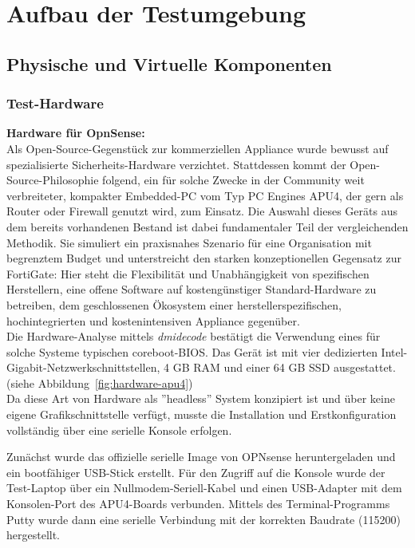 \chapter{Aufbau der Testumgebung}
\section{Physische und Virtuelle Komponenten}
\subsection{Test-Hardware}
\textbf{Hardware für OpnSense:}\\
Als Open-Source-Gegenstück zur kommerziellen Appliance wurde bewusst auf spezialisierte Sicherheits-Hardware verzichtet. Stattdessen kommt der Open-Source-Philosophie folgend, ein für solche Zwecke in der Community weit verbreiteter, kompakter Embedded-PC vom Typ PC Engines APU4, der gern als Router oder Firewall genutzt wird, zum Einsatz. Die Auswahl dieses Geräts aus dem bereits vorhandenen Bestand ist dabei fundamentaler Teil der vergleichenden Methodik. Sie simuliert ein praxisnahes Szenario für eine Organisation mit begrenztem Budget und unterstreicht den starken konzeptionellen Gegensatz zur FortiGate: Hier steht die Flexibilität und Unabhängigkeit von spezifischen Herstellern, eine offene Software auf kostengünstiger Standard-Hardware zu betreiben, dem geschlossenen Ökosystem einer herstellerspezifischen, hochintegrierten und kostenintensiven Appliance gegenüber.\\

Die Hardware-Analyse mittels \textit{dmidecode} bestätigt die Verwendung eines für solche Systeme typischen coreboot-BIOS. Das Gerät ist mit vier dedizierten Intel-Gigabit-Netzwerkschnittstellen, 4 GB RAM und einer 64 GB SSD ausgestattet. (siehe Abbildung~\ref{fig:hardware-apu4})\\

Da diese Art von Hardware als ''headless'' System konzipiert ist und über keine eigene Grafikschnittstelle verfügt, musste die Installation und Erstkonfiguration vollständig über eine serielle Konsole erfolgen.

Zunächst wurde das offizielle serielle Image von OPNsense heruntergeladen und ein bootfähiger USB-Stick erstellt. Für den Zugriff auf die Konsole wurde der Test-Laptop über ein Nullmodem-Seriell-Kabel und einen USB-Adapter mit dem Konsolen-Port des APU4-Boards verbunden. Mittels des Terminal-Programms Putty wurde dann eine serielle Verbindung mit der korrekten Baudrate (115200) hergestellt.\\


